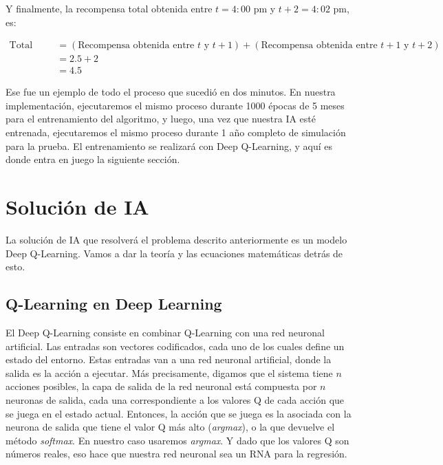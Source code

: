 \documentclass[]{book}
\begin{document}
Y finalmente, la recompensa total obtenida entre \(t = 4:00\) pm y \(t+2 = 4:02\) pm, es:

\begin{align*}
    \textrm{Total Reward}
    & = (\textrm{Recompensa obtenida entre $t$ y $t+1$}) + (\textrm{Recompensa obtenida entre $t+1$ y $t+2$}) \\
    &  = 2.5 + 2 \\
    & = 4.5
\end{align*}

Ese fue un ejemplo de todo el proceso que sucedió en dos minutos. En nuestra implementación, ejecutaremos el mismo proceso durante 1000 épocas de 5 meses para el entrenamiento del algoritmo, y luego, una vez que nuestra IA esté entrenada, ejecutaremos el mismo proceso durante 1 año completo de simulación para la prueba. El entrenamiento se realizará con Deep Q-Learning, y aquí es donde entra en juego la siguiente sección.

\hypertarget{soluciuxf3n-de-ia}{%
\section{Solución de IA}\label{soluciuxf3n-de-ia}}

La solución de IA que resolverá el problema descrito anteriormente es un modelo Deep Q-Learning. Vamos a dar la teoría y las ecuaciones matemáticas detrás de esto.

\hypertarget{q-learning-en-deep-learning}{%
\subsection{Q-Learning en Deep Learning}\label{q-learning-en-deep-learning}}

El Deep Q-Learning consiste en combinar Q-Learning con una red neuronal artificial. Las entradas son vectores codificados, cada uno de los cuales define un estado del entorno. Estas entradas van a una red neuronal artificial, donde la salida es la acción a ejecutar. Más precisamente, digamos que el sistema tiene \(n\) acciones posibles, la capa de salida de la red neuronal está compuesta por \(n\) neuronas de salida, cada una correspondiente a los valores Q de cada acción que se juega en el estado actual. Entonces, la acción que se juega es la asociada con la neurona de salida que tiene el valor Q más alto (\emph{argmax}), o la que devuelve el método \emph{softmax}. En nuestro caso usaremos \emph{argmax}. Y dado que los valores Q son números reales, eso hace que nuestra red neuronal sea un RNA para la regresión.
\end{document}
